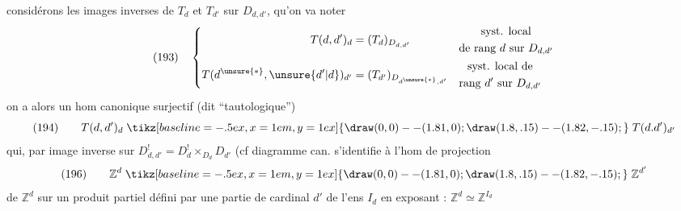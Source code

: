 considérons les images inverses de $T_d$ et $T_{d'}$ sur $D_{d,d'}$, qu'on va noter
\[
(193)\quad\left\{\begin{aligned}
T(d,d')_d&=(T_d)_{D_{d,d'}}&&\begin{gathered}\text{syst. local}\\\text{de rang }d\text{ sur }D_{d,d'}\end{gathered}\\
T(d^{\unsure{*}},\unsure{d'|d})_{d'}&=(T_{d'})_{D_{d^{\unsure{*}},d'}}&&\begin{gathered}\text{syst. local de}\\\text{rang }d'\text{ sur }D_{d,d'}\end{gathered}
\end{aligned}\right.
\]
on a alors un hom canonique surjectif (dit ``tautologique'')
\[
(194)\qquad T(d,d')_d\mathrel{\tikz[baseline=-.5ex,x=1em,y=1ex]{\draw (0,0)--(1.81,0);\draw (1.8,.15)--(1.82,-.15);}}T(d.d')_{d'}
\]
qui, par image inverse sur $D^!_{d,d'}=D^!_d\mathbin\times_{D_d}D_{d'}$ (cf diagramme can.
s'identifie à l'hom de projection
\[
(196)\qquad\mathbb Z^d\mathrel{\tikz[baseline=-.5ex,x=1em,y=1ex]{\draw (0,0)--(1.81,0);\draw (1.8,.15)--(1.82,-.15);}}\mathbb Z^{d'}
\]
de $\mathbb Z^d$ sur un produit partiel défini par une partie de cardinal $d'$ de l'ens $I_d$ en exposant : $\mathbb Z^d\simeq\mathbb Z^{I_d}$
